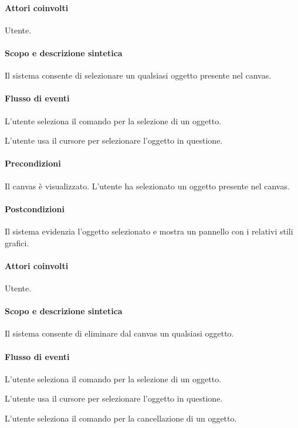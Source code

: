 \paragraph{Attori coinvolti} Utente.
\paragraph{Scopo e descrizione sintetica} Il sistema consente di selezionare un qualsiasi oggetto presente nel canvas.
\paragraph{Flusso di eventi}
\begin{elenconumerato}[\textbf{}]{\subsubsecindent}
\item  L'utente seleziona il comando per la selezione di un oggetto.
\item  L'utente usa il cursore per selezionare l'oggetto in questione.
\end{elenconumerato}
\paragraph{Precondizioni} Il canvas \`e visualizzato. L'utente ha selezionato un oggetto presente nel canvas.
\paragraph{Postcondizioni} Il sistema evidenzia l'oggetto selezionato e mostra un pannello con i relativi stili grafici.

\paragraph{Attori coinvolti} Utente.
\paragraph{Scopo e descrizione sintetica} Il sistema consente di eliminare dal canvas un qualsiasi oggetto.
\paragraph{Flusso di eventi}
\begin{elenconumerato}[\textbf{}]{\subsubsecindent}
\item  L'utente seleziona il comando per la selezione di un oggetto.
\item  L'utente usa il cursore per selezionare l'oggetto in questione.
\item  L'utente seleziona il comando per la cancellazione di un oggetto.
\end{elenconumerato}
